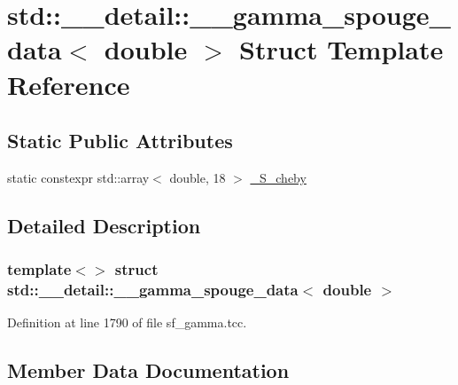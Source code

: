\hypertarget{structstd_1_1____detail_1_1____gamma__spouge__data_3_01double_01_4}{}\section{std\+:\+:\+\_\+\+\_\+detail\+:\+:\+\_\+\+\_\+gamma\+\_\+spouge\+\_\+data$<$ double $>$ Struct Template Reference}
\label{structstd_1_1____detail_1_1____gamma__spouge__data_3_01double_01_4}
\subsection*{Static Public Attributes}
\begin{DoxyCompactItemize}
\item 
static constexpr std\+::array$<$ double, 18 $>$ \hyperlink{structstd_1_1____detail_1_1____gamma__spouge__data_3_01double_01_4_ae7638accff257079573b702a72e01254}{\+\_\+\+S\+\_\+cheby}
\end{DoxyCompactItemize}


\subsection{Detailed Description}
\subsubsection*{template$<$$>$\newline
struct std\+::\+\_\+\+\_\+detail\+::\+\_\+\+\_\+gamma\+\_\+spouge\+\_\+data$<$ double $>$}



Definition at line 1790 of file sf\+\_\+gamma.\+tcc.



\subsection{Member Data Documentation}
\mbox{\label{structstd_1_1____detail_1_1____gamma__spouge__data_3_01double_01_4_ae7638accff257079573b702a72e01254}} 
